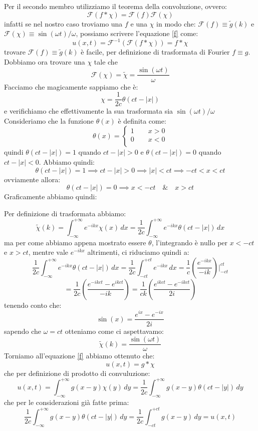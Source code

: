 Per il secondo membro utilizziamo il teorema della convoluzione, ovvero:
\[\mathcal{F}(f*\chi) = \mathcal{F}(f)\mathcal{F}(\chi)\]
infatti se nel nostro caso troviamo una $f$ e una $\chi$ in modo che: $\mathcal{F}(f) \equiv \tilde{g}(k)$ e $\mathcal{F}(\chi) \equiv \sin(\omega t)/\omega$, possiamo scrivere l'equazione \eqref{f} come:
\[u(x,t) = \mathcal{F}^{-1}\left(\mathcal{F}(f*\chi)\right) = f*\chi\]
trovare $\mathcal{F}(f) \equiv \tilde{g}(k)$ è facile, per definizione di trasformata di Fourier $f\equiv g$. Dobbiamo ora trovare una $\chi$ tale che 
\[\mathcal{F}(\chi)=\tilde{\chi} = \frac{\sin(\omega t)}{\omega}\]
Facciamo che magicamente sappiamo che è: \[\chi = \frac{1}{2c}\theta(ct-|x|)\] e verifichiamo che effettivamente la sua trasformata sia $\sin(\omega t)/\omega$
Consideriamo che la funzione $\theta(x)$ è definita come:
\[\theta(x) =\begin{cases}
    1 \qquad x>0  \\
   0\qquad x<0\\
  \end{cases}\]
quindi $\theta(ct-|x|) = 1$ quando $ct-|x|>0$ e $\theta(ct-|x|) = 0$ quando $ct-|x|<0$. Abbiamo quindi:
\[\theta(ct-|x|) = 1 \implies ct-|x|>0 \implies |x|<ct \implies -ct<x<ct\]
ovviamente allora:
\[\theta(ct-|x|) = 0 \implies x<-ct \quad\&\quad x>ct\]
Graficamente abbiamo quindi:
\begin{figure}[H]
\centering
{}
\end{figure}
Per definizione di trasformata abbiamo:
\[\tilde{\chi}(k) = \int_{-\infty}^{+\infty}e^{-ikx}\chi(x)\,dx =\frac{1}{2c}\int_{-\infty}^{+\infty}e^{-ikx}\theta(ct-|x|)\,dx \]
ma per come abbiamo appena mostrato essere $\theta$, l'integrando è nullo per $x<-ct$ e $x>ct$, mentre vale $e^{-ikx}$ altrimenti, ci riduciamo quindi a:
\[\frac{1}{2c}\int_{-\infty}^{+\infty}e^{-ikx}\theta(ct-|x|)\,dx = \frac{1}{2c}\int_{-ct}^{+ct}e^{-ikx}\,dx = \frac{1}{c}\left(\frac{e^{-ikx}}{-ik}\right)\bigg\vert_{-ct}^{ct}\]
\[= \frac{1}{2c}\left(\frac{e^{-ikct}-e^{ikct}}{-ik} \right) =\frac{1}{ck}\left(\frac{e^{ikct}-e^{-ikct}}{2i} \right) \]
tenendo conto che:
\[\sin(x) = \frac{e^{ix}-e^{-ix}}{2i}\]
sapendo che $\omega=ct$ otteniamo come ci aspettavamo:
\[\tilde{\chi}(k) =\frac{\sin(\omega t)} {\omega}\]
Torniamo all'equazione \eqref{f} abbiamo ottenuto che:
\[u(x,t) = g*\chi\]
che per definizione di prodotto di convuluzione:
\[u(x,t) = \int_{-\infty}^{+\infty}g(x-y)\chi(y)\,dy = \frac{1}{2c}\int_{-\infty}^{+\infty}g(x-y)\theta(ct-|y|)\,dy\]
che per le considerazioni già fatte prima:
\[\frac{1}{2c}\int_{-\infty}^{+\infty}g(x-y)\theta(ct-|y|)\,dy=\frac{1}{2c}\int_{-ct}^{+ct}g(x-y)\,dy = u(x,t)\]
